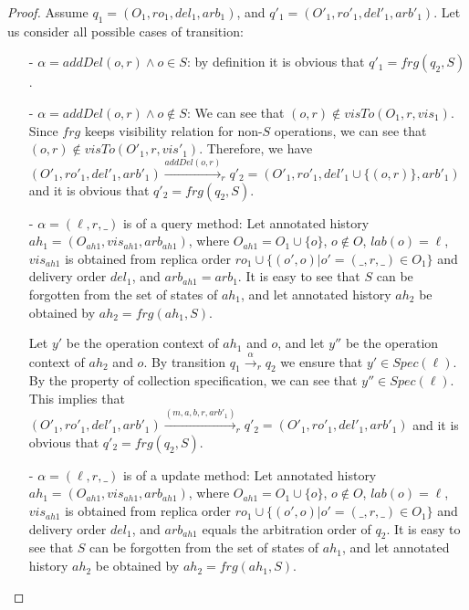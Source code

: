 \begin {proof}

Assume $q_1 = (O_1,\mathit{ro}_1,\mathit{del}_1,\mathit{arb}_1)$, and $q'_1 = (O'_1,\mathit{ro}'_1,\mathit{del}'_1,\mathit{arb}'_1)$. Let us consider all possible cases of transition:

\begin{itemize}
\setlength{\itemsep}{0.5pt}
\item[-] $\alpha = \mathit{addDel}(o,r) \wedge o \in S$: by definition it is obvious that $q'_1 = \mathit{frg}(q_2,S)$.

\item[-] $\alpha = \mathit{addDel}(o,r) \wedge o \notin S$: We can see that $(o,r)\notin visTo(O_1,r,\mathit{vis}_1)$. Since $\mathit{frg}$ keeps visibility relation for non-$S$ operations, we can see that $(o,r)\notin visTo(O'_1,r,\mathit{vis}'_1)$. Therefore, we have $ (O'_1,\mathit{ro}'_1,\mathit{del}'_1,\mathit{arb}'_1) {\xrightarrow{addDel(o,r)}}_r q'_2 = (O'_1,\mathit{ro}'_1,\mathit{del}'_1 \cup \{ (o,r) \},\mathit{arb}'_1)$ and it is obvious that $q'_2 = \mathit{frg}(q_2,S)$.

\item[-] $\alpha = (\ell,r,\_)$ is of a query method: Let annotated history $\mathit{ah}_1 = (O_{\mathit{ah1}},\mathit{vis}_{\mathit{ah1}},\mathit{arb}_{\mathit{ah1}})$, where $O_{\mathit{ah1}} = O_1 \cup \{ o \}$, $o \notin O$, $\mathit{lab}(o)=\ell$, $\mathit{vis}_{\mathit{ah1}}$ is obtained from replica order $\mathit{ro}_1 \cup \{ (o',o) \vert o' = (\_,r,\_) \in O_1\}$ and delivery order $\mathit{del}_1$, and $\mathit{arb}_{\mathit{ah1}} = \mathit{arb}_1$. It is easy to see that $S$ can be forgotten from the set of states of $\mathit{ah}_1$, and let annotated history $\mathit{ah}_2$ be obtained by $\mathit{ah}_2 = \mathit{frg}(\mathit{ah}_1,S)$.

    Let $y'$ be the operation context of $\mathit{ah}_1$ and $o$, and let $y''$ be the operation context of $\mathit{ah}_2$ and $o$. By transition $q_1 {\xrightarrow{\alpha}}_r q_2$ we ensure that $y' \in \mathit{Spec}(\ell)$. By the property of collection specification, we can see that $y'' \in \mathit{Spec}(\ell)$. This implies that $(O'_1,\mathit{ro}'_1,\mathit{del}'_1,\mathit{arb}'_1) {\xrightarrow{(m,a,b,r,\mathit{arb}'_1)}}_r q'_2 = (O'_1,\mathit{ro}'_1,\mathit{del}'_1,\mathit{arb}'_1)$ and it is obvious that $q'_2 = \mathit{frg}(q_2,S)$.

\item[-] $\alpha = (\ell,r,\_)$ is of a update method: Let annotated history $\mathit{ah}_1 = (O_{\mathit{ah1}},\mathit{vis}_{\mathit{ah1}},\mathit{arb}_{\mathit{ah1}})$, where $O_{\mathit{ah1}} = O_1 \cup \{ o \}$, $o \notin O$, $\mathit{lab}(o)=\ell$, $\mathit{vis}_{\mathit{ah1}}$ is obtained from replica order $\mathit{ro}_1 \cup \{ (o',o) \vert o' = (\_,r,\_) \in O_1\}$ and delivery order $\mathit{del}_1$, and $\mathit{arb}_{\mathit{ah1}}$ equals the arbitration order of $q_2$. It is easy to see that $S$ can be forgotten from the set of states of $\mathit{ah}_1$, and let annotated history $\mathit{ah}_2$ be obtained by $\mathit{ah}_2 = \mathit{frg}(\mathit{ah}_1,S)$.


\end{itemize}
\end{proof}
